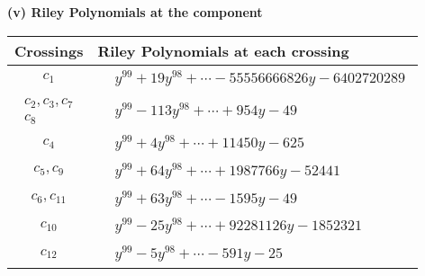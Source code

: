 \documentclass[1p]{elsarticle_modified}
\theoremstyle{definition}
\begin{document}
\newpage\renewcommand{\arraystretch}{1}
\flushleft \textbf{(v) Riley Polynomials at the component}\newline \\
\begin{tabular}{m{50pt}|m{274pt}}
Crossings & \hspace{64pt}Riley Polynomials at each crossing \\
\hline $$\begin{aligned}c_{1}\end{aligned}$$&$\begin{aligned}
&y^{99}+19 y^{98}+\cdots-55556666826 y-6402720289
\end{aligned}$\\
\hline $$\begin{aligned}c_{2},c_{3},c_{7}\\c_{8}\end{aligned}$$&$\begin{aligned}
&y^{99}-113 y^{98}+\cdots+954 y-49
\end{aligned}$\\
\hline $$\begin{aligned}c_{4}\end{aligned}$$&$\begin{aligned}
&y^{99}+4 y^{98}+\cdots+11450 y-625
\end{aligned}$\\
\hline $$\begin{aligned}c_{5},c_{9}\end{aligned}$$&$\begin{aligned}
&y^{99}+64 y^{98}+\cdots+1987766 y-52441
\end{aligned}$\\
\hline $$\begin{aligned}c_{6},c_{11}\end{aligned}$$&$\begin{aligned}
&y^{99}+63 y^{98}+\cdots-1595 y-49
\end{aligned}$\\
\hline $$\begin{aligned}c_{10}\end{aligned}$$&$\begin{aligned}
&y^{99}-25 y^{98}+\cdots+92281126 y-1852321
\end{aligned}$\\
\hline $$\begin{aligned}c_{12}\end{aligned}$$&$\begin{aligned}
&y^{99}-5 y^{98}+\cdots-591 y-25
\end{aligned}$\\
\hline
\end{tabular}\\~\\
\end{document}
